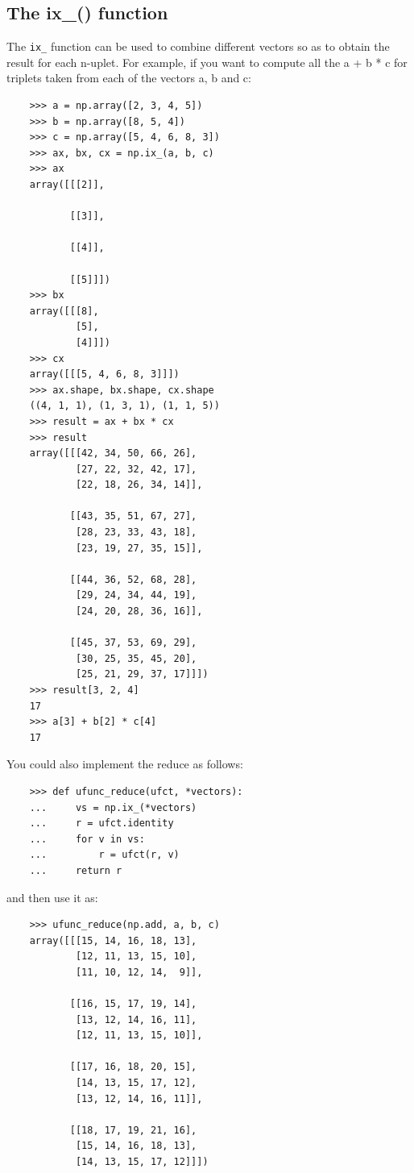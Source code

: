 \documentclass[UTF8]{article}
\begin{document}
\subsection{The ix\_() function}
The \texttt{ix\_} function can be used to combine different vectors so as to obtain the result for
each n-uplet. For example, if you want to compute all the a + b * c for triplets taken from each of
the vectors a, b and c:
\begin{verbatim}
    >>> a = np.array([2, 3, 4, 5])
    >>> b = np.array([8, 5, 4])
    >>> c = np.array([5, 4, 6, 8, 3])
    >>> ax, bx, cx = np.ix_(a, b, c)
    >>> ax
    array([[[2]],

           [[3]],

           [[4]],

           [[5]]])
    >>> bx
    array([[[8],
            [5],
            [4]]])
    >>> cx
    array([[[5, 4, 6, 8, 3]]])
    >>> ax.shape, bx.shape, cx.shape
    ((4, 1, 1), (1, 3, 1), (1, 1, 5))
    >>> result = ax + bx * cx
    >>> result
    array([[[42, 34, 50, 66, 26],
            [27, 22, 32, 42, 17],
            [22, 18, 26, 34, 14]],

           [[43, 35, 51, 67, 27],
            [28, 23, 33, 43, 18],
            [23, 19, 27, 35, 15]],

           [[44, 36, 52, 68, 28],
            [29, 24, 34, 44, 19],
            [24, 20, 28, 36, 16]],

           [[45, 37, 53, 69, 29],
            [30, 25, 35, 45, 20],
            [25, 21, 29, 37, 17]]])
    >>> result[3, 2, 4]
    17
    >>> a[3] + b[2] * c[4]
    17
\end{verbatim}

You could also implement the reduce as follows:
\begin{verbatim}
    >>> def ufunc_reduce(ufct, *vectors):
    ...     vs = np.ix_(*vectors)
    ...     r = ufct.identity
    ...     for v in vs:
    ...         r = ufct(r, v)
    ...     return r
\end{verbatim}
and then use it as:
\begin{verbatim}
    >>> ufunc_reduce(np.add, a, b, c)
    array([[[15, 14, 16, 18, 13],
            [12, 11, 13, 15, 10],
            [11, 10, 12, 14,  9]],

           [[16, 15, 17, 19, 14],
            [13, 12, 14, 16, 11],
            [12, 11, 13, 15, 10]],

           [[17, 16, 18, 20, 15],
            [14, 13, 15, 17, 12],
            [13, 12, 14, 16, 11]],

           [[18, 17, 19, 21, 16],
            [15, 14, 16, 18, 13],
            [14, 13, 15, 17, 12]]])
\end{verbatim}
\end{document}
